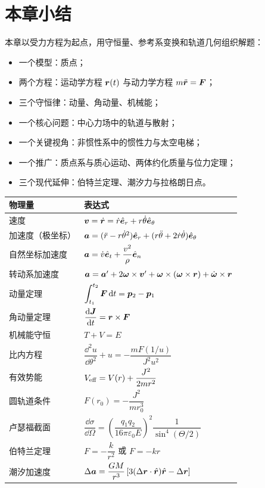 \section*{本章小结}

本章以受力方程为起点，用守恒量、参考系变换和轨道几何组织解题：
\begin{itemize}[leftmargin=2.2em]
  \item 一个模型：质点；
  \item 两个方程：运动学方程 $\boldsymbol{r}(t)$ 与动力学方程 $m\ddot{\boldsymbol{r}}=\boldsymbol{F}$；
  \item 三个守恒律：动量、角动量、机械能；
  \item 一个核心问题：中心力场中的轨道与散射；
  \item 一个关键视角：非惯性系中的惯性力与太空电梯；
  \item 一个推广：质点系与质心运动、两体约化质量与位力定理；
  \item 三个现代延伸：伯特兰定理、潮汐力与拉格朗日点。
\end{itemize}

\begin{center}
\renewcommand{\arraystretch}{1.5}
\begin{tabular}{ll}
\toprule
物理量 & 表达式 \\
\midrule
速度 & $\boldsymbol{v}=\dot{\boldsymbol{r}}=\dot r\hat{\boldsymbol{e}}_r+r\dot\theta\hat{\boldsymbol{e}}_\theta$ \\
加速度（极坐标） & $\boldsymbol{a}=(\ddot r-r\dot\theta^2)\hat{\boldsymbol{e}}_r+(r\ddot\theta+2\dot r\dot\theta)\hat{\boldsymbol{e}}_\theta$ \\
自然坐标加速度 & $\boldsymbol{a}=\dot v\hat{\boldsymbol{e}}_t+\dfrac{v^2}{\rho}\hat{\boldsymbol{e}}_n$ \\
转动系加速度 & $\boldsymbol{a}=\boldsymbol{a}'+2\boldsymbol{\omega}\times\boldsymbol{v}'+\boldsymbol{\omega}\times(\boldsymbol{\omega}\times\boldsymbol{r})+\dot{\boldsymbol{\omega}}\times\boldsymbol{r}$ \\
动量定理 & $\displaystyle\int_{t_1}^{t_2}\boldsymbol{F}\,\mathrm{d} t=\boldsymbol{p}_2-\boldsymbol{p}_1$ \\
角动量定理 & $\dfrac{\mathrm{d}\boldsymbol{J}}{\mathrm{d} t}=\boldsymbol{r}\times\boldsymbol{F}$ \\
机械能守恒 & $T+V=E$ \\
比内方程 & $\dfrac{\dd^2u}{\dd\theta^2}+u=-\dfrac{mF(1/u)}{J^2u^2}$ \\
有效势能 & $V_{\rm eff}=V(r)+\dfrac{J^2}{2mr^2}$ \\
圆轨道条件 & $F(r_0)=-\dfrac{J^2}{mr_0^3}$ \\
卢瑟福截面 & $\dfrac{\dd\sigma}{\dd\Omega}=\left(\dfrac{q_1q_2}{16\pi\varepsilon_0E}\right)^2\dfrac{1}{\sin^4(\Theta/2)}$ \\
伯特兰定理 & $F=-\dfrac{k}{r^2}$ 或 $F=-kr$ \\
潮汐加速度 & $\Delta\boldsymbol{a}=\dfrac{GM}{r^3}\left[3(\Delta\boldsymbol{r}\cdot\hat{\boldsymbol{r}})\hat{\boldsymbol{r}}-\Delta\boldsymbol{r}\right]$ \\
\bottomrule
\end{tabular}
\end{center}

